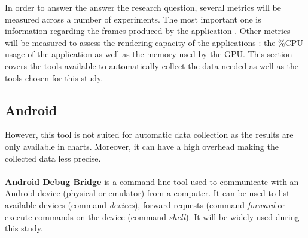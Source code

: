 In order to answer the answer the research question, several metrics will be measured across a number of experiments. The most important one is information regarding the frames produced by the application
. Other metrics will be measured to assess the rendering capacity of the applications : the \%CPU usage of the application as well as the memory used by the GPU. This section covers the tools available to automatically collect the data needed as well as the tools chosen for this study.  


\subsection{Android}
However, this tool is not suited for automatic data collection as the results are only available in charts. Moreover, it can have a high overhead \cite{nanoscope} making the collected data less precise.

\paragraph{}
\textbf{Android Debug Bridge} \cite{adb} is a command-line tool used to communicate with an Android device (physical or emulator) from a computer. It can be used to list available devices (command \textit{devices}), forward requests (command \textit{forward} or execute commands on the device (command \textit{shell}). It will be widely used during this study. 

